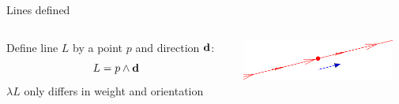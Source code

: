 \documentclass{beamer}
\begin{document}
\begin{frame}{Lines defined}
  \begin{columns}
    \begin{column}{5cm}
      Define line $L$ by a point $p$ and direction $\mathbf{d}$:
      \begin{equation*}
        L  = p \wedge \mathbf{d}
      \end{equation*}
      $\lambda L$ only differs in weight and orientation
    \end{column}
    \begin{column}{5cm}
      \begin{center}
        \includegraphics[width=5cm]{line}
      \end{center}
    \end{column}
  \end{columns}
\end{frame}
\end{document}
